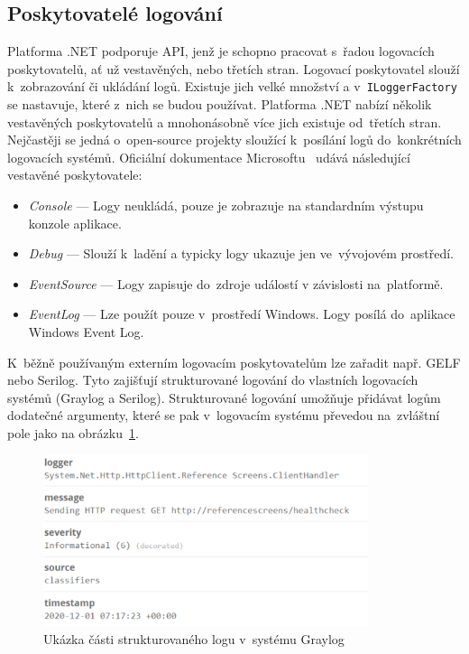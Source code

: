 \subsection{Poskytovatelé logování}
\label{poskytovatele-logovani}
Platforma .NET podporuje API, jenž je schopno pracovat s~řadou logovacích poskytovatelů, ať už vestavěných, nebo třetích stran. Logovací poskytovatel slouží k~zobrazování či ukládání logů. Existuje jich velké množství a v~\texttt{ILoggerFactory} se nastavuje, které z~nich se budou používat. Platforma .NET nabízí několik vestavěných poskytovatelů a mnohonásobně více jich existuje od~třetích stran. Nejčastěji se jedná o~open-source projekty sloužící k~posílání logů do~konkrétních logovacích systémů. Oficiální dokumentace Microsoftu~\cite{logging} udává následující vestavěné poskytovatele: 

\begin{itemize}
  \item \emph{Console} --- Logy neukládá, pouze je zobrazuje na standardním výstupu konzole aplikace.
  \item \emph{Debug} --- Slouží k~ladění a typicky logy ukazuje jen ve~vývojovém prostředí.
  \item \emph{EventSource} --- Logy zapisuje do~zdroje událostí v závislosti na~platformě.
  \item \emph{EventLog} --- Lze použít pouze v~prostředí Windows. Logy posílá do~aplikace Windows Event Log.
\end{itemize}

K~běžně používaným externím logovacím poskytovatelům lze zařadit např. GELF nebo Serilog. Tyto zajišťují strukturované logování do vlastních logovacích systémů (Graylog a Serilog). Strukturované logování umožňuje přidávat logům dodatečné argumenty, které se pak v~logovacím systému převedou na~zvláštní pole jako na obrázku~\ref{structured-log-img}.

\begin{figure}[hbt]
	\centering
	\includegraphics[width=0.85\textwidth]{obrazky/structured-log.pdf}
	\caption{Ukázka části strukturovaného logu v~systému Graylog}
	\label{structured-log-img}
\end{figure}

